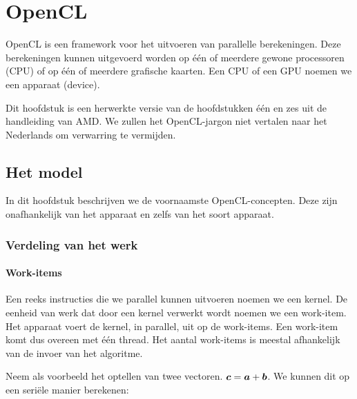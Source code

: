 \chapter{OpenCL}
\label{h:opencl} 
OpenCL is een framework voor het uitvoeren van parallelle berekeningen. Deze berekeningen kunnen uitgevoerd worden op \'e\'en of meerdere gewone processoren (CPU) of op \'e\'en of meerdere grafische kaarten. Een CPU of een GPU noemen we een apparaat (device).

Dit hoofdstuk is een herwerkte versie van de hoofdstukken \'e\'en en zes uit de handleiding van AMD\cite{amd}. We zullen het OpenCL-jargon niet vertalen naar het Nederlands om verwarring te vermijden. 


\section{Het model}
In dit hoofdstuk beschrijven we de voornaamste OpenCL-concepten. Deze zijn onafhankelijk van het apparaat en zelfs van het soort apparaat.
\subsection{Verdeling van het werk}
\subsubsection{Work-items}
Een reeks instructies die we parallel kunnen uitvoeren noemen we een kernel. De eenheid van werk dat door een kernel verwerkt wordt noemen we een work-item. Het apparaat voert de kernel, in parallel, uit op de work-items. Een work-item komt dus overeen met \'e\'en thread. Het aantal work-items is meestal afhankelijk van de invoer van het algoritme.

Neem als voorbeeld het optellen van twee vectoren. $\boldsymbol{c} = \boldsymbol{a} + \boldsymbol{b}$. We kunnen dit op een seri\"ele manier berekenen:

